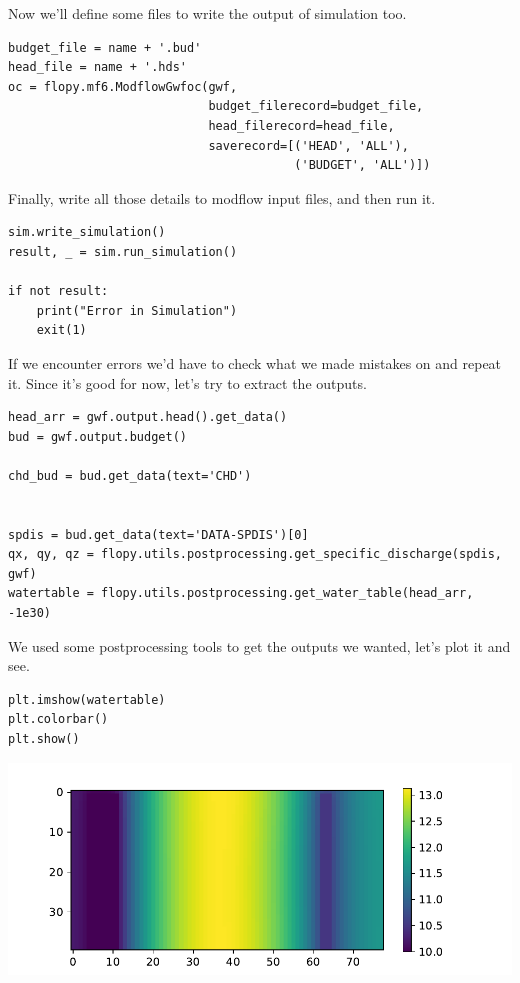 \documentclass[titlepage,12pt]{unisubmission}
\begin{document}
Now we'll define some files to write the output of simulation too.

\begin{verbatim}
budget_file = name + '.bud'
head_file = name + '.hds'
oc = flopy.mf6.ModflowGwfoc(gwf,
                            budget_filerecord=budget_file,
                            head_filerecord=head_file,
                            saverecord=[('HEAD', 'ALL'),
                                        ('BUDGET', 'ALL')])
\end{verbatim}

Finally, write all those details to modflow input files, and then run it.

\begin{verbatim}
sim.write_simulation()
result, _ = sim.run_simulation()

if not result:
    print("Error in Simulation")
    exit(1)
\end{verbatim}

If we encounter errors we'd have to check what we made mistakes on and repeat it. Since it's good for now, let's try to extract the outputs.

\begin{verbatim}
head_arr = gwf.output.head().get_data()
bud = gwf.output.budget()

chd_bud = bud.get_data(text='CHD')


spdis = bud.get_data(text='DATA-SPDIS')[0]
qx, qy, qz = flopy.utils.postprocessing.get_specific_discharge(spdis, gwf)
watertable = flopy.utils.postprocessing.get_water_table(head_arr, -1e30)
\end{verbatim}

We used some postprocessing tools to get the outputs we wanted, let's plot it and see.

\begin{verbatim}
plt.imshow(watertable)
plt.colorbar()
plt.show()
\end{verbatim}

\begin{center}
\includegraphics[width=.9\linewidth]{./images/3_watertable.pdf}
\end{center}
\end{document}
